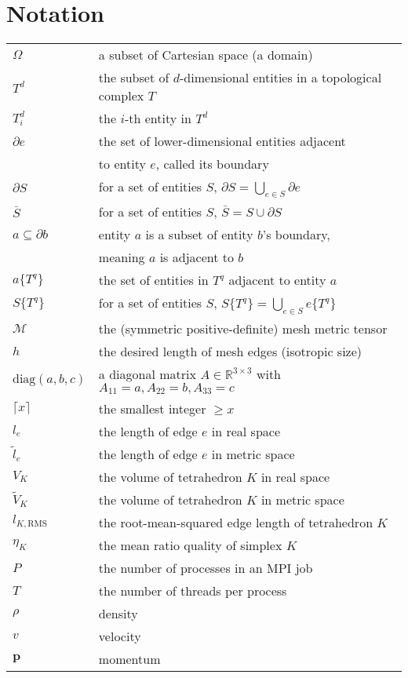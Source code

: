 \section{Notation}

\begin{tabular}{l|l}
$\Omega$ & a subset of Cartesian space (a domain) \\
$T^d$ & the subset of $d$-dimensional entities in a topological complex $T$ \\
$T^d_i$ & the $i$-th entity in $T^d$ \\
$\partial e$ & the set of lower-dimensional entities adjacent \\
 & to entity $e$, called its boundary \\
$\partial S$ & for a set of entities $S$, $\partial S = \bigcup_{e\in S} \partial e$ \\
$\bar{S}$ & for a set of entities $S$, $\bar{S} = S \cup \partial S$ \\
$a \subseteq \partial b$ & entity $a$ is a subset of entity $b$'s boundary, \\
 & meaning $a$ is adjacent to $b$ \\
$a\{T^q\}$ & the set of entities in $T^q$ adjacent to entity $a$ \\
$S\{T^q\}$ & for a set of entities $S$, $S\{T^q\} = \bigcup_{e\in S} e\{T^q\}$ \\
$\mathcal{M}$ & the (symmetric positive-definite) mesh metric tensor \\
$h$ & the desired length of mesh edges (isotropic size) \\
$\text{diag}(a,b,c)$ & a diagonal matrix $A\in\mathbb{R}^{3\times 3}$ with
   $A_{11}=a,A_{22}=b,A_{33}=c$ \\
$\lceil x\rceil$ & the smallest integer $\geq x$ \\
$l_e$ & the length of edge $e$ in real space \\
$\tilde{l}_e$ & the length of edge $e$ in metric space \\
$V_K$ & the volume of tetrahedron $K$ in real space \\
$\tilde{V}_K$ & the volume of tetrahedron $K$ in metric space \\
$l_{K,\text{RMS}}$ & the root-mean-squared edge length of tetrahedron $K$ \\
$\eta_K$ & the mean ratio quality of simplex $K$ \\ \hline
$P$ & the number of processes in an MPI job \\
$T$ & the number of threads per process \\ \hline
$\rho$ & density \\
$v$ & velocity \\
$\mathbf{p}$ & momentum \\
\end{tabular}

